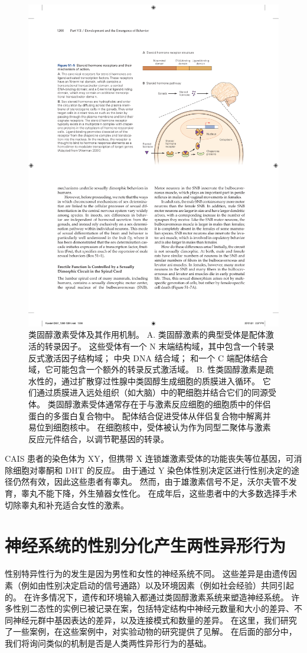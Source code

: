 \begin{figure}[htbp]
	\centering
	\includegraphics[width=0.6\linewidth]{chap51/fig_51_5}
	\caption{类固醇激素受体及其作用机制。
		A. 类固醇激素的典型受体是配体激活的转录因子。
		这些受体有一个 N 末端结构域，其中包含一个转录反式激活因子结构域；
		中央 DNA 结合域；
		和一个 C 端配体结合域，它可能包含一个额外的转录反式激活域。
		B. 性类固醇激素是疏水性的，通过扩散穿过性腺中类固醇生成细胞的质膜进入循环。
		它们通过质膜进入远处组织（如大脑）中的靶细胞并结合它们的同源受体。
		类固醇激素受体通常存在于与激素反应细胞的细胞质中的伴侣蛋白的多蛋白复合物中。
		配体结合促进受体从伴侣复合物中解离并易位到细胞核中。
		在细胞核中，受体被认为作为同型二聚体与激素反应元件结合，以调节靶基因的转录\cite{wierman2007sex}。}
	\label{fig:51_5}
\end{figure}


CAIS 患者的染色体为 XY，但携带 X 连锁雄激素受体的功能丧失等位基因，可消除细胞对睾酮和 DHT 的反应。
由于通过 Y 染色体性别决定区进行性别决定的途径仍然有效，因此这些患者有睾丸。
然而，由于雄激素信号不足，沃尔夫管不发育，睾丸不能下降，外生殖器女性化。
在成年后，这些患者中的大多数选择手术切除睾丸和补充适合女性的激素。



\section{神经系统的性别分化产生两性异形行为}

性别特异性行为的发生是因为男性和女性的神经系统不同。
这些差异是由遗传因素（例如由性别决定启动的信号通路）以及环境因素（例如社会经验）共同引起的。
在许多情况下，遗传和环境输入都通过类固醇激素系统来塑造神经系统。
许多性别二态性的实例已被记录在案，包括特定结构中神经元数量和大小的差异、不同神经元群中基因表达的差异，以及连接模式和数量的差异。
在这里，我们研究了一些案例，在这些案例中，对实验动物的研究提供了见解。
在后面的部分中，我们将询问类似的机制是否是人类两性异形行为的基础。


